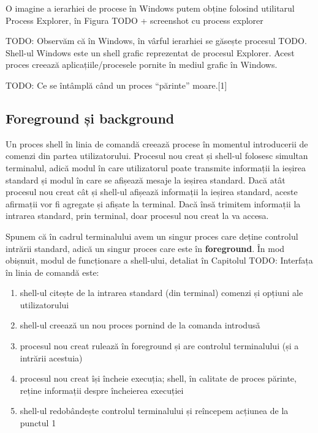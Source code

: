 O imagine a ierarhiei de procese în Windows putem obține folosind utilitarul
Process Explorer, în Figura TODO + screenshot cu process explorer

TODO: Observăm că în Windows, în vârful ierarhiei se găsește procesul TODO.
Shell-ul Windows este un shell grafic reprezentat de procesul Explorer. Acest
proces creează aplicațiile/procesele pornite în mediul grafic în Windows.

TODO: Ce se întâmplă când un proces “părinte” moare.[1]

\subsection{Foreground și background}
\label{sec:procese-ierarhie-foreground-background}

Un proces shell în linia de comandă creează procese în momentul introducerii de
comenzi din partea utilizatorului. Procesul nou creat și shell-ul folosesc
simultan terminalul, adică modul în care utilizatorul poate transmite informații
la ieșirea standard și modul în care se afișează mesaje la ieșirea standard.
Dacă atât procesul nou creat cât și shell-ul afișează informații la ieșirea
standard, aceste afirmații vor fi agregate și afișate la terminal. Dacă însă
trimitem informații la intrarea standard, prin terminal, doar procesul nou creat
la va accesa.

Spunem că în cadrul terminalului avem un singur proces care deține controlul
intrării standard, adică un singur proces care este în \textbf{foreground}. În
mod obișnuit, modul de funcționare a shell-ului, detaliat în Capitolul TODO:
Interfața în linia de comandă este:

\begin{enumerate}
	\item shell-ul citește de la intrarea standard (din terminal) comenzi și
		opțiuni ale utilizatorului
	\item shell-ul creează un nou proces pornind de la comanda introdusă
	\item procesul nou creat rulează în foreground și are controlul
		terminalului (și a intrării acestuia)
	\item procesul nou creat își încheie execuția; shell, în calitate de
		proces părinte, reține informații despre încheierea execuției
	\item shell-ul redobândește controlul terminalului și reîncepem acțiunea
		de la punctul 1
\end{enumerate}

